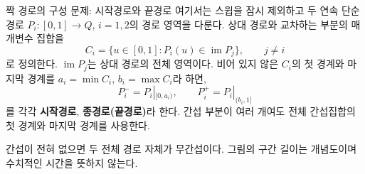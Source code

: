 \begin{frame}{짝 경로의 구성 문제: 시작경로와 끝경로}
\small
여기서는 스윕을 잠시 제외하고 두 연속 단순 경로 $P_i:[0,1]\to Q$,
$i=1,2$의 경로 영역을 다룬다. 상대 경로와 교차하는 부분의 매개변수 집합을
\begin{equation}
 C_i=\{u\in[0,1]:P_i(u)\in\operatorname{im}P_j\},\qquad j\ne i
 \tag{27}
\end{equation}
로 정의한다. $\operatorname{im}P_j$는 상대 경로의 전체 영역이다.
비어 있지 않은 $C_i$의 첫 경계와 마지막 경계를 $a_i=\min C_i$,
$b_i=\max C_i$라 하면,
\begin{equation}
 P_i^-=P_i|_{[0,a_i)},\qquad P_i^+=P_i|_{(b_i,1]}
 \tag{28}
\end{equation}
를 각각 \textbf{시작경로}, \textbf{종경로(끝경로)}라 한다.
간섭 부분이 여러 개여도 전체 간섭집합의 첫 경계와 마지막 경계를 사용한다.
\begin{center}\end{center}
\footnotesize 간섭이 전혀 없으면 두 전체 경로 자체가 무간섭이다.
그림의 구간 길이는 개념도이며 수치적인 시간을 뜻하지 않는다.
\end{frame}

